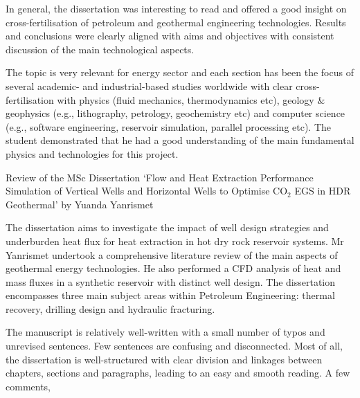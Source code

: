 \documentclass[14pt,twoside]{report}
\begin{document}
In general, the dissertation was interesting to read and offered a good insight on cross-fertilisation of petroleum and geothermal engineering technologies. Results and conclusions were clearly aligned with aims and objectives with consistent discussion of the main technological aspects. 

The topic is very relevant for energy sector and each section has been the focus of several academic- and industrial-based studies worldwide with clear cross-fertilisation with physics (fluid mechanics, thermodynamics etc), geology $\&$ geophysics (e.g., lithography, petrology, geochemistry etc) and computer science (e.g., software engineering, reservoir simulation, parallel processing etc). The student demonstrated that he had a good understanding of the main fundamental physics and technologies for this project.


\clearpage



\bigskip

\begin{center}
{\Large Review of the MSc Dissertation `Flow and Heat Extraction Performance Simulation of Vertical Wells and Horizontal Wells to Optimise CO$_{2}$ EGS in HDR Geothermal' by Yuanda Yanrismet}
\end{center}

\medskip

The dissertation aims to investigate the impact of well design strategies and underburden heat flux for heat extraction in hot dry rock reservoir systems. Mr Yanrismet undertook a comprehensive literature review of the main aspects of geothermal energy technologies. He also performed a CFD analysis of heat and mass fluxes in a synthetic reservoir with distinct well design. The dissertation encompasses three main subject areas within Petroleum Engineering: thermal recovery, drilling design and hydraulic fracturing.

The manuscript is relatively well-written with a small number of typos and unrevised sentences. Few sentences are confusing and disconnected. Most of all, the dissertation is well-structured with clear division and linkages between chapters, sections and paragraphs, leading to an easy and smooth reading.  A few comments,
\end{document}

